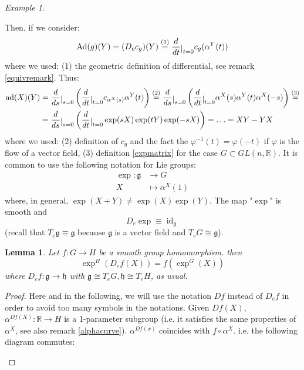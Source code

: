 \documentclass[a4paper,11pt,titlepage, article, oneside]{memoir}
\numberwithin{equation}{section}
\newtheorem{lemma}[theorem]{Lemma}
\theoremstyle{definition}
\theoremstyle{remark}
\newtheorem{example}[theorem]{Example}
\DeclareMathOperator{\id}{id}
\newcommand{\rfield}{\mathbb{R}}
\newcommand{\lie}[1]{\mathfrak{#1}}
\newcommand{\restrict}[2]{{#1}\raisebox{-.5ex}{$|$}_{#2}}
\newcommand{\diondi}[1]{\frac{d}{d{#1}}}
\begin{document}
\begin{tcolorbox}
\begin{example}
\begin{enumerate}
\end{enumerate}
Then, if we consider:
$$\text{Ad}(g)(Y) = (D_e c_g)(Y) \overset{(1)}{=}  \restrict{\diondi{t}}{t=0} c_g (\alpha^Y(t))$$
where we used: (1) the geometric definition of differential, see remark \ref{equivremark}.
Thus:
\begin{align*}
\text{ad}(X)(Y) &= \restrict{\diondi{s}}{s=0} \left(  \restrict{\diondi{t}}{t=0} c_{\alpha^X(s)} \alpha^Y (t) \right ) \overset{(2)}{=} \restrict{\diondi{s}}{s=0} \left(  \restrict{\diondi{t}}{t=0} \alpha^X(s) \alpha^Y(t) \alpha^X(-s) \right)  \overset{(3)}{=}  \\
&= \restrict{\diondi{s}}{s=0} \left(  \restrict{\diondi{t}}{t=0} \exp(sX) \exp(tY) \exp(-sX) \right) = \ldots = XY -YX
\end{align*}
where we used: (2) definition of $c_g$ and the fact the $\varphi^{-1}(t) = \varphi(-t)$ if $\varphi$ is the flow of a vector field, (3) definition \eqref{expmatrix} for the case $G \subset GL(n, \rfield)$.
It is common to use the following notation for Lie groups:
\begin{align}
\exp \colon \lie{g} &\rightarrow G \\
X &\mapsto \alpha^X(1) \nonumber
\end{align}
where, in general, $\exp(X+Y) \not = \exp(X)\exp(Y)$. The map "$\exp$" is smooth and
\begin{equation} \label{deexp}
D_e \exp \equiv \id_{\lie{g}}
\end{equation}
(recall that $T_e \lie{g} \equiv \lie{g}$ because $\lie{g}$ is a vector field and $T_e G \cong \lie{g}$).
\end{example}
\end{tcolorbox}

\begin{lemma}
Let $f \colon G \rightarrow H$ be a smooth group homomorphism. then
\begin{equation}
\exp^H \left(D_ef(X) \right) = f \left( \exp^G(X) \right)
\end{equation}
where $D_ef \colon \lie{g} \rightarrow \lie{h}$ with $\lie{g} \cong T_e G, \lie{h} \cong T_e H$, as usual.
\end{lemma}
\begin{proof}
Here and in the following, we will use the notation $Df$ instead of $D_ef$ in order to avoid too many symbols in the notations. Given $Df(X)$, $\alpha^{Df(X)} \colon \rfield \rightarrow H$ is a 1-parameter subgroup (i.e. it satisfies the same properties of $\alpha^X$, see also remark \ref{alphacurve}). $\alpha^{Df(x)}$ coincides with $f \circ \alpha^X$. i.e. the following diagram commutes:
\begin{center}
\end{center}
\end{proof}
\end{document}
